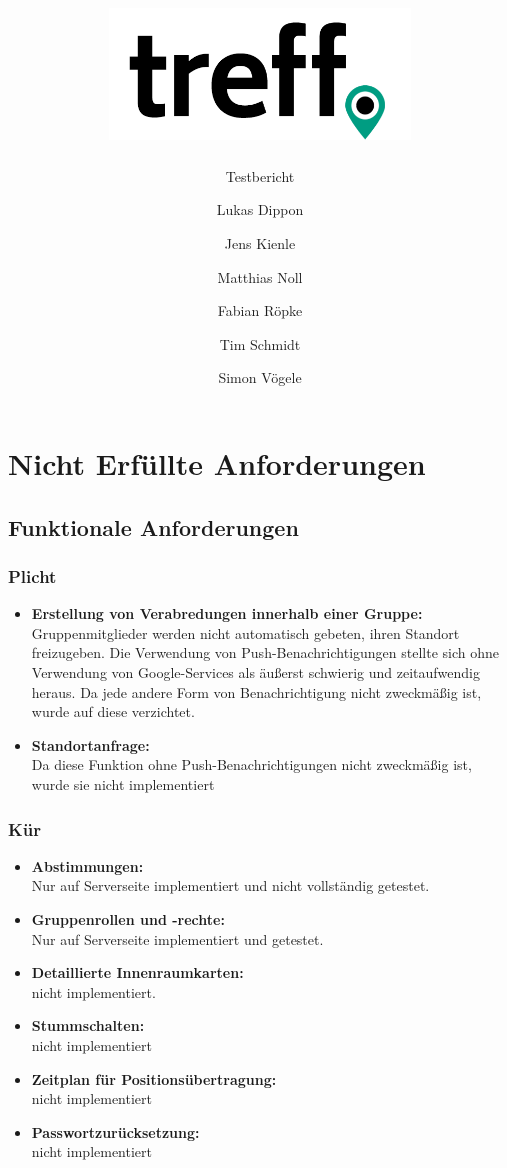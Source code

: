 \documentclass[parskip=full,11pt]{scrartcl}
\title{\includegraphics[width = 80mm]{images/logo_crop.png}}
\subtitle{\huge Testbericht}
\author{Lukas Dippon
        \and Jens Kienle
        \and Matthias Noll
        \and Fabian Röpke
        \and Tim Schmidt
        \and Simon Vögele}
\begin{document}
\maketitle
\thispagestyle{empty} %

\pagebreak
\tableofcontents

\pagebreak
\section{Nicht Erfüllte Anforderungen}
	\subsection{Funktionale Anforderungen}
		\subsubsection{Plicht}
			\begin{itemize}
              \item \textbf{Erstellung von Verabredungen innerhalb einer Gruppe:}\\
							\label{notification}Gruppenmitglieder werden nicht automatisch
							gebeten, ihren Standort freizugeben. Die Verwendung von
							Push-Benachrichtigungen stellte sich ohne Verwendung von
							Google-Services als äußerst schwierig und zeitaufwendig heraus.
							Da jede andere Form von Benachrichtigung nicht zweckmäßig ist,
							wurde auf diese verzichtet.
                \item \textbf{Standortanfrage:}\\
							\label{requestPosition}Da diese Funktion ohne
							Push-Benachrichtigungen nicht zweckmäßig ist,
							wurde sie nicht implementiert
			\end{itemize}

		\subsubsection{Kür}
			\begin{itemize}
                \item \textbf{Abstimmungen:}\\
							Nur auf Serverseite implementiert und nicht vollständig getestet.
                \item \textbf{Gruppenrollen und -rechte:}\\
							Nur auf Serverseite implementiert und getestet.
                \item \textbf{Detaillierte Innenraumkarten:}\\
							nicht implementiert.
                \item \textbf{Stummschalten:}\\
							nicht implementiert
                \item \textbf{Zeitplan für Positionsübertragung:}\\
							nicht implementiert
                \item \textbf{Passwortzurücksetzung:}\\
							nicht implementiert
			\end{itemize}
\end{document}

